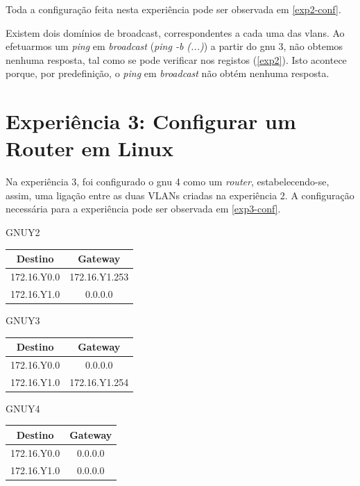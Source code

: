 \documentclass[article, a4paper, 11pt, oneside]{memoir}
\begin{document}
Toda a configuração feita nesta experiência pode ser observada em \ref{exp2-conf}.

Existem dois domínios de broadcast, correspondentes a cada uma das vlans.
Ao efetuarmos um \textit{ping} em \textit{broadcast} (\textit{ping -b (...)}) a partir do gnu 3,
não obtemos nenhuma resposta, tal como se pode verificar nos registos (\ref{exp2}). Isto acontece
porque, por predefinição, o \textit{ping} em \textit{broadcast} não obtém nenhuma resposta.

\section{\textbf{Experiência 3}: Configurar um Router em Linux}

Na experiência 3, foi configurado o gnu 4 como um \textit{router}, estabelecendo-se, assim, 
uma ligação entre as duas VLANs criadas na experiência 2. A configuração necessária para a 
experiência pode ser observada em \ref{exp3-conf}.

\begin{center}
  GNUY2
  \begin{tabular}{||c c||} 
  \hline
  Destino & Gateway \\ [0.5ex] 
  \hline\hline
  172.16.Y0.0 & 172.16.Y1.253  \\ 
  \hline
  172.16.Y1.0 & 0.0.0.0 \\ [1ex] 
  \hline
 \end{tabular}
\end{center}


 \begin{center} 
  GNUY3
  \begin{tabular}{||c c||} 
  \hline
  Destino & Gateway \\ [0.5ex] 
  \hline\hline
  172.16.Y0.0 & 0.0.0.0 \\ 
  \hline
  172.16.Y1.0 & 172.16.Y1.254 \\ [1ex] 
  \hline
 \end{tabular}
\end{center}


 \begin{center}
  GNUY4
  \begin{tabular}{||c c||} 
  \hline
  Destino & Gateway \\ [0.5ex] 
  \hline\hline
  172.16.Y0.0 & 0.0.0.0  \\ 
  \hline
  172.16.Y1.0 & 0.0.0.0 \\ [1ex] 
  \hline
 \end{tabular}
\end{center}
\end{document}
